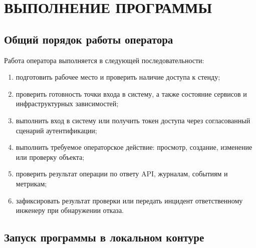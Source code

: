 \documentclass[12pt,a4paper]{extarticle}
\begin{document}
\clearpage

\section{ВЫПОЛНЕНИЕ ПРОГРАММЫ}

\subsection{Общий порядок работы оператора}

\begin{hseExample}
Работа оператора выполняется в следующей последовательности:

\begin{enumerate}[label=\arabic*), leftmargin=1.25cm]
    \item подготовить рабочее место и проверить наличие доступа к стенду;
    \item проверить готовность точки входа в систему, а также состояние сервисов и инфраструктурных зависимостей;
    \item выполнить вход в систему или получить токен доступа через согласованный сценарий аутентификации;
    \item выполнить требуемое операторское действие: просмотр, создание, изменение или проверку объекта;
    \item проверить результат операции по ответу API, журналам, событиям и метрикам;
    \item зафиксировать результат проверки или передать инцидент ответственному инженеру при обнаружении отказа.
\end{enumerate}
\end{hseExample}

\subsection{Запуск программы в локальном контуре}
\end{document}
